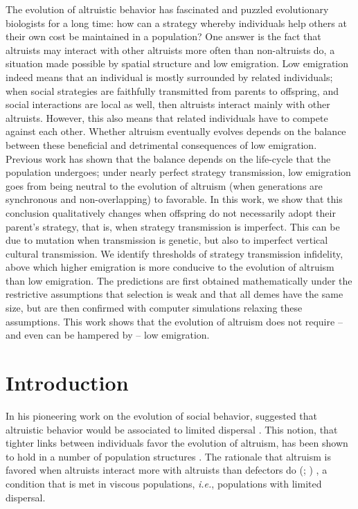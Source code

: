\documentclass[11pt, letterpaper]{article}
\newcommand{\ie}{\textit{i.e.}}
\newcommand{\eg}{\textit{e.g.}}
\begin{document}
The evolution of altruistic behavior has fascinated and puzzled evolutionary biologists for a long time: how can a strategy whereby individuals help others at their own cost be maintained in a population? One answer is the fact that altruists may interact with other altruists more often than non-altruists do, a situation made possible by spatial structure and low emigration. Low emigration indeed means that an individual is mostly surrounded by related individuals; when social strategies are faithfully transmitted from parents to offspring, and social interactions are local as well, then altruists interact mainly with other altruists. However, this also means that related individuals have to compete against each other. Whether altruism eventually evolves depends on the balance between these beneficial and detrimental consequences of low emigration. Previous work has shown that the balance depends on the life-cycle that the population undergoes; under nearly perfect strategy transmission, low emigration goes from being neutral to the evolution of altruism (when generations are synchronous and non-overlapping) to favorable. In this work, we show that this conclusion qualitatively changes when offspring do not necessarily adopt their parent's strategy, that is, when strategy transmission is imperfect. This can be due to mutation when transmission is genetic, but also to imperfect vertical cultural transmission. We identify thresholds of strategy transmission infidelity, above which higher emigration is more conducive to the evolution of altruism than low emigration. The predictions are first obtained mathematically under the restrictive assumptions that selection is weak and that all demes have the same size, but are then confirmed with computer simulations relaxing these assumptions. This work shows that the evolution of altruism does not require -- and even can be hampered by -- low emigration. 





\clearpage



\section{Introduction}%
In his pioneering work on the evolution of social behavior, \citeauthor{Hamilton1964} suggested that altruistic behavior would be associated to limited dispersal \citep[p.~10]{Hamilton1964}. This notion, that tighter links between individuals favor the evolution of altruism, has been shown to hold in a number of population structures  \citep[see \eg][]{Ohtsuki2006, TaylorDayWild2007, Lehmann2007}. The rationale that altruism is favored when altruists interact more with altruists than defectors do (\citealp[p.~141]{Hamilton1975}; \citealp{Fletcher2009})%
, a condition that is met in viscous populations, \ie, populations with limited dispersal.
\end{document}
